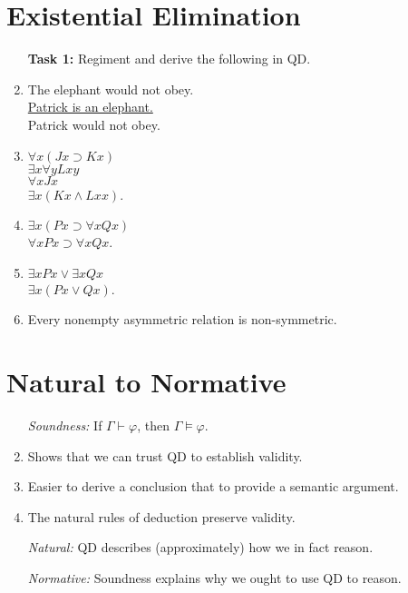 \documentclass[a4paper, 11pt]{article} %
\newcommand{\qt}[2]{#1 #2} %
\begin{document}
\section*{Existential Elimination}

\begin{enumerate}
  \item[\bf Task 1:] Regiment and derive the following in QD.
  \item The elephant would not obey.\\
    \underline{Patrick is an elephant.}\\ 
    Patrick would not obey.
  \item $\qt{\forall}{x}(Jx \supset Kx)$\\
    $\qt{\exists}{x}\qt{\forall}{y} Lxy$\\
    \underline{$\qt{\forall}{x} Jx$}\\
    $\qt{\exists}{x}(Kx \wedge Lxx)$.
  \item \underline{$\qt{\exists}{x}(Px \supset \qt{\forall}{x}Qx)$}\\
    $\qt{\forall}{x}Px \supset \qt{\forall}{x}Qx$.
  \item \underline{$\qt{\exists}{x}Px \vee \qt{\exists}{x}Qx$}\\
    $\qt{\exists}{x}(Px \vee Qx)$.
  \item Every nonempty asymmetric relation is non-symmetric.
\end{enumerate}





\section*{Natural to Normative}

\begin{enumerate}
  \item[\it Soundness:] If $\Gamma \vdash \varphi$, then $\Gamma \vDash \varphi$.
  \item Shows that we can trust QD to establish validity.
  \item Easier to derive a conclusion that to provide a semantic argument.
  \item The natural rules of deduction preserve validity.
  \item[\it Natural:] QD describes (approximately) how we in fact reason.
  \item[\it Normative:] Soundness explains why we ought to use QD to reason.
\end{enumerate}
\end{document}

